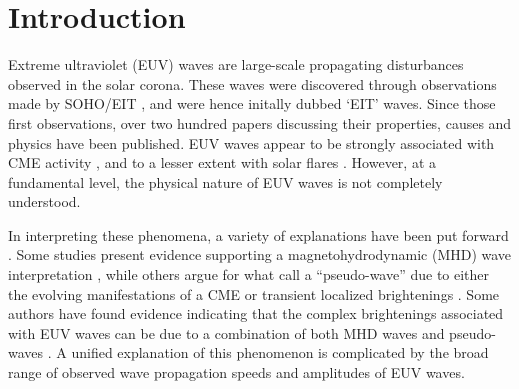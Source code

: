 \documentclass[namedreferences]{solarphysics}
\begin{document}
\begin{article}
\begin{opening}
%
%
% 



\end{opening}

\section{Introduction}\label{sec:Intro}

Extreme ultraviolet (EUV) waves are large-scale propagating
disturbances observed in the solar corona. These waves were discovered
through observations made by SOHO/EIT \citep{1997SoPh..175..571M,
  1998GeoRL..25.2465T, 1999ApJ...517L.151T}, and were hence initally
dubbed `EIT' waves. Since those first observations, over two hundred
papers discussing their properties, causes and physics have been
published. EUV waves appear to be strongly associated with CME
activity \cite{2002ApJ...569.1009B}, and to a lesser extent with solar
flares \citep{2006ApJ...641L.153}. However, at a fundamental level,
the physical nature of EUV waves is not completely understood.

In interpreting these phenomena, a variety of explanations have been
put forward \citep[see][for a review of current interpretations of EUV
waves]{2011SSRv..158..365G}. Some studies present evidence supporting
a magnetohydrodynamic (MHD) wave interpretation
\citep{1998GeoRL..25.2465T, 1999ApJ...517L.151T,2000ApJ...543L..89W,
  2001JGR...10625089W, 2002ApJ...574..440O, 2010ApJ...713.1008S},
while others argue for what \cite{2012SoPh..281..187P} call a
“pseudo-wave” due to either the evolving manifestations of a CME
\citep{1999SoPh..190..107D, 2000ApJ...545..512D, 2008SoPh..247..123D,
  2011ApJ...738..167S} or transient localized brightenings
\citep{2007ApJ...656L.101A, 2007AN....328..760A}.  Some authors have
found evidence indicating that the complex brightenings associated
with EUV waves can be due to a combination of both MHD waves and
pseudo-waves \citep{2002ApJ...572L..99C, 2005ApJ...622.1202C,
  2004A&A...427..705Z, 2009ApJ...705..587C}. A unified explanation of
this phenomenon is complicated by the broad range of observed wave
propagation speeds \citep{2011A&A...532A.151W} and amplitudes of EUV
waves.


\end{article}
\end{document}
